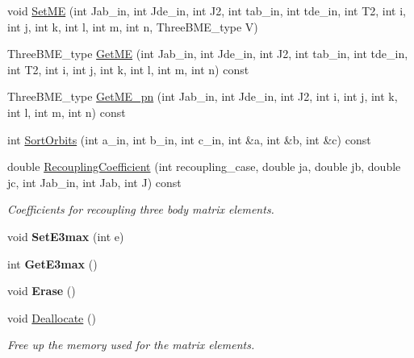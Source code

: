 \begin{DoxyCompactItemize}
\item 
void \hyperlink{classThreeBodyME_ad316c3872bdd9f08e0ccc1efda8bb93b}{Set\+ME} (int Jab\+\_\+in, int Jde\+\_\+in, int J2, int tab\+\_\+in, int tde\+\_\+in, int T2, int i, int j, int k, int l, int m, int n, Three\+B\+M\+E\+\_\+type V)
\item 
Three\+B\+M\+E\+\_\+type \hyperlink{classThreeBodyME_abd4f77aa9d0981c3ad1a61c2b2c54246}{Get\+ME} (int Jab\+\_\+in, int Jde\+\_\+in, int J2, int tab\+\_\+in, int tde\+\_\+in, int T2, int i, int j, int k, int l, int m, int n) const
\item 
Three\+B\+M\+E\+\_\+type \hyperlink{classThreeBodyME_a366e6d2a60c1ec6187b57e80b9efc5e3}{Get\+M\+E\+\_\+pn} (int Jab\+\_\+in, int Jde\+\_\+in, int J2, int i, int j, int k, int l, int m, int n) const
\item 
int \hyperlink{classThreeBodyME_a010cb75dc914b87796422d5f462d866d}{Sort\+Orbits} (int a\+\_\+in, int b\+\_\+in, int c\+\_\+in, int \&a, int \&b, int \&c) const
\item 
\mbox{\label{classThreeBodyME_a3d0c0bce680bd29077c3ec35871f1753}} 
double \hyperlink{classThreeBodyME_a3d0c0bce680bd29077c3ec35871f1753}{Recoupling\+Coefficient} (int recoupling\+\_\+case, double ja, double jb, double jc, int Jab\+\_\+in, int Jab, int J) const
\begin{DoxyCompactList}\small\item\em Coefficients for recoupling three body matrix elements. \end{DoxyCompactList}\item 
\mbox{\label{classThreeBodyME_a53bc2c2f32e80e6cbd4098e5785520d9}} 
void {\bfseries Set\+E3max} (int e)
\item 
\mbox{\label{classThreeBodyME_abd3a778ed4cb554160163bed8b44ec01}} 
int {\bfseries Get\+E3max} ()
\item 
\mbox{\label{classThreeBodyME_a9542aab705a2a418e81681ef37c3306f}} 
void {\bfseries Erase} ()
\item 
\mbox{\label{classThreeBodyME_a2f61d6489e4213d8e8921017f6584b38}} 
void \hyperlink{classThreeBodyME_a2f61d6489e4213d8e8921017f6584b38}{Deallocate} ()
\begin{DoxyCompactList}\small\item\em Free up the memory used for the matrix elements. \end{DoxyCompactList}\item 

\end{DoxyCompactItemize}
